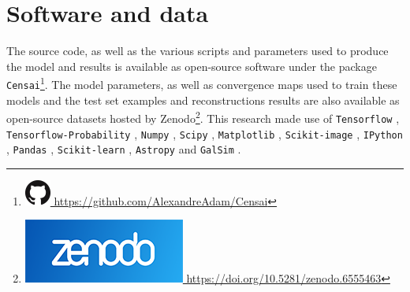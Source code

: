 \section*{Software and data}
The source code, as well as the various scripts and parameters used to 
produce the model and results is available as open-source software 
under the package \texttt{Censai}\footnote{
\href{https://github.com/AlexandreAdam/Censai}{
\includegraphics[scale=0.25]{figures/GitHub-Mark-32px.png}
https://github.com/AlexandreAdam/Censai}}. 
The model parameters, as well as convergence maps used to train 
these models and the test set examples and reconstructions results are also available as open-source datasets hosted by Zenodo\footnote{\href{https://doi.org/10.5281/zenodo.6555463}
{\includegraphics[scale=0.1]{figures/zenodo}
https://doi.org/10.5281/zenodo.6555463}}. This research made use of \texttt{Tensorflow} \citep{tensorflow}, 
\texttt{Tensorflow-Probability} \citep{tensorflow-probability}, 
\texttt{Numpy} \citep{numpy}, 
\texttt{Scipy} \citep{scipy}, 
\texttt{Matplotlib} \citep{matplotlib}, 
\texttt{Scikit-image} \citep{scikit-image}, 
\texttt{IPython} \citep{ipython}, 
\texttt{Pandas} \citep{pandas1,pandas2}, 
\texttt{Scikit-learn} \citep{scikit-learn}, 
\texttt{Astropy} \citep{astropy:2013,astropy:2018} 
and \texttt{GalSim} \citep{galsim}.

%

